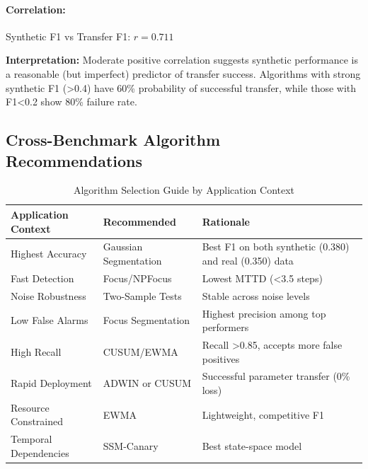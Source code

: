 \paragraph{Correlation:} Synthetic F1 vs Transfer F1: $r = 0.711$

\textbf{Interpretation:} Moderate positive correlation suggests synthetic performance is a reasonable (but imperfect) predictor of transfer success. Algorithms with strong synthetic F1 (>0.4) have 60\% probability of successful transfer, while those with F1<0.2 show 80\% failure rate.


\subsection{Cross-Benchmark Algorithm Recommendations}
\label{sec:recommendations}

\begin{table}[H]
\centering
\caption{Algorithm Selection Guide by Application Context}
\label{tab:algorithm_guide}
\small
\begin{tabular}{p{4cm}p{4cm}p{5cm}}
\toprule
\textbf{Application Context} & \textbf{Recommended} & \textbf{Rationale} \\
\midrule
Highest Accuracy & Gaussian Segmentation & Best F1 on both synthetic (0.380) and real (0.350) data \\
Fast Detection & Focus/NPFocus & Lowest MTTD (<3.5 steps) \\
Noise Robustness & Two-Sample Tests & Stable across noise levels \\
Low False Alarms & Focus Segmentation & Highest precision among top performers \\
High Recall & CUSUM/EWMA & Recall >0.85, accepts more false positives \\
Rapid Deployment & ADWIN or CUSUM & Successful parameter transfer (0\% loss) \\
Resource Constrained & EWMA & Lightweight, competitive F1 \\
Temporal Dependencies & SSM-Canary & Best state-space model \\
\bottomrule
\end{tabular}
\end{table}






